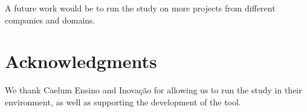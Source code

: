 \documentclass{sig-alternate}
\begin{document}
A future work would be to run the study on more projects from different companies and 
domains.

\section{Acknowledgments}

We thank Caelum Ensino and Inovação for allowing us to run the study in their environment,
as well as supporting the development of the tool.



\end{document}
